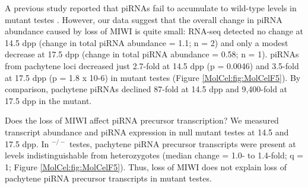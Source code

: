     A previous study reported that piRNAs fail to accumulate to wild-type levels in \miwi{} mutant testes \citep{Grivna2006}. However, our data suggest that the overall change in piRNA abundance caused by loss of MIWI is quite small: RNA-seq detected no change at 14.5 dpp (change in total piRNA abundance = 1.1; n = 2) and only a modest decrease at 17.5 dpp (change in total piRNA abundance = 0.58; n = 1). piRNAs from pachytene loci decreased just 2.7-fold at 14.5 dpp (p = 0.0046) and 3.5-fold at 17.5 dpp (p = 1.8 x 10-6) in \miwi{} mutant testes (Figure \ref{MolCel:fig:MolCelF5}). By comparison, pachytene piRNAs declined 87-fold at 14.5 dpp and 9,400-fold at 17.5 dpp in the \amyb{} mutant.

    Does the loss of MIWI affect piRNA precursor transcription? We measured transcript abundance and piRNA expression in \miwi{} null mutant testes at 14.5 and 17.5 dpp. In \miwi{}$^{-/-}$ testes, pachytene piRNA precursor transcripts were present at levels indistinguishable from \miwi{} heterozygotes (median change = 1.0- to 1.4-fold; q = 1; Figure \ref{MolCel:fig:MolCelF5}). Thus, loss of MIWI does not explain loss of pachytene piRNA precursor transcripts in \amyb{} mutant testes.

